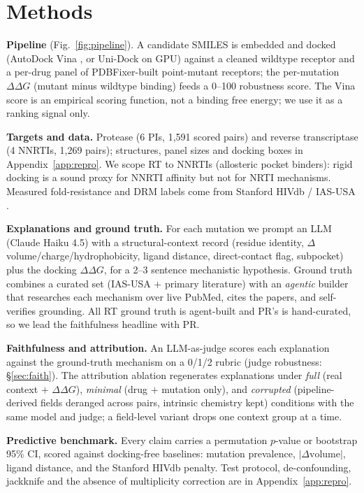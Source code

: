 \documentclass{article}
\newcommand{\ddg}{\ensuremath{\Delta\Delta G}}
\begin{document}
\section{Methods}
\textbf{Pipeline} (Fig.~\ref{fig:pipeline}). A candidate SMILES is embedded and docked (AutoDock Vina \citep{vina}, or Uni-Dock \citep{unidock} on GPU) against a cleaned wildtype receptor and a per-drug panel of PDBFixer-built point-mutant receptors; the per-mutation \ddg{} (mutant minus wildtype binding) feeds a 0--100 robustness score. The Vina score is an empirical scoring function, not a binding free energy; we use it as a ranking signal only.

\textbf{Targets and data.} Protease (6 PIs, 1{,}591 scored pairs) and reverse transcriptase (4 NNRTIs, 1{,}269 pairs); structures, panel sizes and docking boxes in Appendix~\ref{app:repro}. We scope RT to NNRTIs (allosteric pocket binders): rigid docking is a sound proxy for NNRTI affinity but not for NRTI mechanisms. Measured fold-resistance and DRM labels come from Stanford HIVdb / IAS-USA \citep{rhee2006,iasusa}.

\textbf{Explanations and ground truth.} For each mutation we prompt an LLM (Claude Haiku 4.5) with a structural-context record (residue identity, $\Delta$volume/charge/hydrophobicity, ligand distance, direct-contact flag, subpocket) plus the docking \ddg, for a 2--3 sentence mechanistic hypothesis. Ground truth combines a curated set (IAS-USA $+$ primary literature) with an \emph{agentic} builder that researches each mechanism over live PubMed, cites the papers, and self-verifies grounding. All RT ground truth is agent-built and PR's is hand-curated, so we lead the faithfulness headline with PR.

\textbf{Faithfulness and attribution.} An LLM-as-judge scores each explanation against the ground-truth mechanism on a 0/1/2 rubric (judge robustness: \S\ref{sec:faith}). The attribution ablation regenerates explanations under \emph{full} (real context $+$ \ddg), \emph{minimal} (drug $+$ mutation only), and \emph{corrupted} (pipeline-derived fields deranged across pairs, intrinsic chemistry kept) conditions with the same model and judge; a field-level variant drops one context group at a time.

\textbf{Predictive benchmark.} Every claim carries a permutation $p$-value or bootstrap 95\% CI, scored against docking-free baselines: mutation prevalence, $|\Delta\text{volume}|$, ligand distance, and the Stanford HIVdb penalty. Test protocol, de-confounding, jackknife and the absence of multiplicity correction are in Appendix~\ref{app:repro}.
\end{document}
